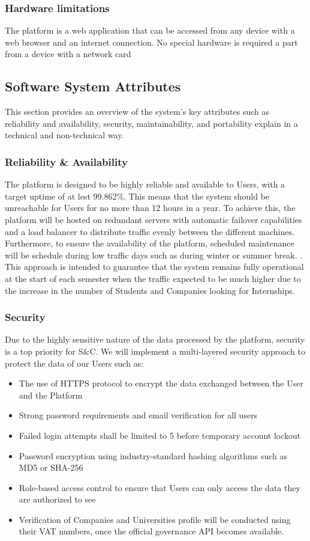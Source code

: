 \subsubsection{Hardware limitations}
The platform is a web application that can be accessed from any device with a web browser and an internet connection. No special hardware is required a part from a device with a network card
\subsection{Software System Attributes}
This section provides an overview of the system's key attributes such as reliability and availability, security, maintainability, and portability explain in a technical and non-technical way.
\subsubsection{Reliability \& Availability}
The platform is designed to be highly reliable and available to Users, with a target uptime of at lest 99.862\%. This means that the system should be unreachable for Users for no more than 12 hours in a year. To achieve this, the platform will be hosted on redundant servers with automatic failover capabilities and a load balancer to distribute traffic evenly between the different machines. \\
Furthermore, to ensure the availability of the platform, scheduled maintenance will be schedule during low traffic days such as during winter or summer break. . This approach is intended to guarantee that the system remains fully operational at the start of each semester when the traffic expected to be much higher due to the increase in the number of Students and Companies looking for Internships.\\
\subsubsection{Security}
Due to the highly sensitive nature of the data processed by the platform, security is a top priority for S\&C. We will implement a multi-layered security approach to protect the data of our Users such as:
\begin{itemize}
  \item The use of HTTPS protocol to encrypt the data exchanged between the User and the Platform
  \item Strong password requirements and email verification for all users
  \item Failed login attempts shall be limited to 5 before temporary account lockout
  \item Password encryption using industry-standard hashing algorithms such as MD5 or SHA-256
  \item Role-based access control to ensure that Users can only access the data they are authorized to see
  \item Verification of Companies and Universities profile will be conducted using their VAT numbers, once the official governance API becomes available.
\end{itemize}

